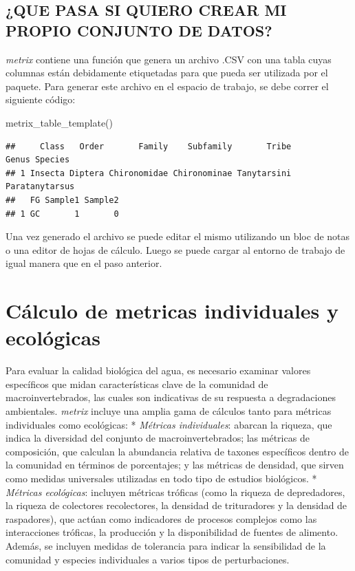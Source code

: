 \documentclass[
]{book}
\newenvironment{Shaded}{\begin{snugshade}}{\end{snugshade}}
\newcommand{\FunctionTok}[1]{\textcolor[rgb]{0.00,0.00,0.00}{#1}}
\newcommand{\NormalTok}[1]{#1}
\begin{document}
\hypertarget{que-pasa-si-quiero-crear-mi-propio-conjunto-de-datos}{%
\subsection{¿QUE PASA SI QUIERO CREAR MI PROPIO CONJUNTO DE DATOS?}\label{que-pasa-si-quiero-crear-mi-propio-conjunto-de-datos}}

\emph{metrix} contiene una función que genera un archivo .CSV con una tabla cuyas columnas están debidamente etiquetadas para que pueda ser utilizada por el paquete.
Para generar este archivo en el espacio de trabajo, se debe correr el siguiente código:

\begin{Shaded}
\begin{Highlighting}[]
\FunctionTok{metrix\_table\_template}\NormalTok{()}
\end{Highlighting}
\end{Shaded}

\begin{verbatim}
##     Class   Order       Family    Subfamily       Tribe          Genus Species
## 1 Insecta Diptera Chironomidae Chironominae Tanytarsini Paratanytarsus        
##   FG Sample1 Sample2
## 1 GC       1       0
\end{verbatim}

Una vez generado el archivo se puede editar el mismo utilizando un bloc de notas o una editor de hojas de cálculo.
Luego se puede cargar al entorno de trabajo de igual manera que en el paso anterior.

\hypertarget{cuxe1lculo-de-metricas-individuales-y-ecoluxf3gicas}{%
\section{Cálculo de metricas individuales y ecológicas}\label{cuxe1lculo-de-metricas-individuales-y-ecoluxf3gicas}}

Para evaluar la calidad biológica del agua, es necesario examinar valores específicos que midan características clave de la comunidad de macroinvertebrados, las cuales son indicativas de su respuesta a degradaciones ambientales.
\emph{metrix} incluye una amplia gama de cálculos tanto para métricas individuales como ecológicas: * \emph{Métricas individuales}: abarcan la riqueza, que indica la diversidad del conjunto de macroinvertebrados; las métricas de composición, que calculan la abundancia relativa de taxones específicos dentro de la comunidad en términos de porcentajes; y las métricas de densidad, que sirven como medidas universales utilizadas en todo tipo de estudios biológicos.
* \emph{Métricas ecológicas}: incluyen métricas tróficas (como la riqueza de depredadores, la riqueza de colectores recolectores, la densidad de trituradores y la densidad de raspadores), que actúan como indicadores de procesos complejos como las interacciones tróficas, la producción y la disponibilidad de fuentes de alimento.
Además, se incluyen medidas de tolerancia para indicar la sensibilidad de la comunidad y especies individuales a varios tipos de perturbaciones.
\end{document}
